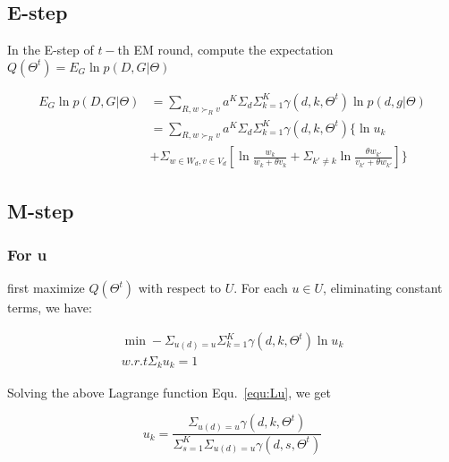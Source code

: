 \documentclass{article}
\begin{document}
\subsection{E-step}
 In the E-step of $t-$th  EM round, compute the expectation $Q(\Theta^t)=E_{G} \ln p(D,G|\Theta) $

\begin{align}\label{equ:estep}
E_{G} \ln p(D,G|\Theta) & =\sum_{R,w \succ_R v} a^K \Sigma_{d} \Sigma_{k=1}^K \gamma(d,k,\Theta^t) \ln p(d,g|\Theta)\\ \nonumber
& = \sum_{R,w \succ_R v} a^K \Sigma_d \Sigma_{k=1}^K \gamma(d,k,\Theta^t) \{ \ln u_k \\ \nonumber
&+ \Sigma_{w\in W_d, v\in V_d} [\ln \frac{w_k}{w_k +\theta v_k} +\Sigma_{k'\neq k} \ln \frac{\theta w_{k'}}{v_{k'}+\theta w_{k'}}]\}
\end{align}


\subsection{M-step}

\subsubsection{For u}
first maximize $Q(\Theta^t)$ with respect to $U$. For each $u \in U$, eliminating constant terms, we have:

\begin{align}\label{equ:Lu}
\min -\Sigma_{u(d)=u} \Sigma_{k=1}^K \gamma(d,k,\Theta^t) \ln u_k\\ \nonumber
w.r.t \Sigma_k u_k =1
\end{align}

Solving the above Lagrange function Equ.~\ref{equ:Lu}, we get

\begin{equation}\label{equ:u}
u_k =\frac{\Sigma_{u(d)=u}\gamma(d,k,\Theta^t)}{\Sigma_{s=1}^K \Sigma_{u(d)=u}\gamma(d,s,\Theta^t)}
\end{equation}
\end{document}
